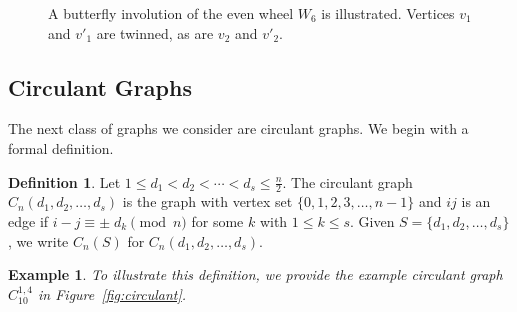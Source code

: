 \documentclass{article}
\newtheorem{example}[theorem]{Example}
\theoremstyle{definition}
\newtheorem{definition}[theorem]{Definition}
\begin{document}
\begin{figure}[ht] 
\begin{center} 

\caption{A butterfly involution of the even wheel $W_6$ is illustrated. Vertices $v_1$ and $v'_1$ are twinned, as are $v_2$ and $v'_2$.}
\label{fig:even-wheel}

\end{center}
\end{figure} 


\subsection{Circulant Graphs}

The next class of graphs we consider are circulant graphs. We begin with a formal definition.

\begin{definition}
    \rm Let $1\leq d_1<d_2< \cdots <d_s\leq \frac{n}{2}$. 
    The circulant graph $C_n(d_1,d_2,\dots,d_s)$ is the graph with vertex set $\{0,1,2,3, \ldots, n-1\}$ and $ij$ is an edge if $i - j \equiv \pm \; d_k \pmod n$  for some $k$ with $1 \le k \le s$. Given $S=\{d_1, d_2, \ldots, d_s\}$, we write $C_n(S)$ for $C_n(d_1,d_2,\dots,d_s)$.
\end{definition}

\begin{example} \rm 
    To illustrate this definition, we provide the example circulant graph $C_{10}^{1,4}$ in Figure~\ref{fig:circulant}. 
\end{example}
\end{document}
